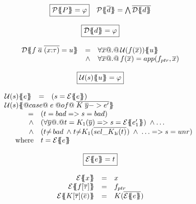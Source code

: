 \begin{figure}\small
\setlength{\arraycolsep}{2pt}
\[\begin{array}{c}
\ruleform{\ptrans{\Sigma}{P} = \formula{\phi} } \quad
\ptrans{\Sigma}{\ol{d}} = \bigwedge \ol{\dtrans{\Sigma}{d}}
\\ \\
\ruleform{\dtrans{\Sigma}{d} = \formula{\phi}} \\ \\
\begin{array}{rcl}
  \dtrans{\Sigma}{f \;\ol{a}\;\ol{(x{:}\tau)} = u}
    & =     & \formula{\forall \ol{x} @.@\, \utrans{\sigma}{u}{f(\ol{x})}} \\
    & \land & \formula{\forall \ol{x} @.@\, f(\ol{x}) = app(f_{ptr},\xs)} \\
\end{array}
\\ \\
\ruleform{\utrans{\Sigma}{u}{s} = \formula{\phi}} \\ \\
\begin{array}{rcl}
\utrans{\Sigma}{e}{s}
  & = & \formula{(s = \etrans{\Sigma}{\Gamma}{e})} \\
\multicolumn{3}{l}{\utrans{\Sigma}
    {@case@\;e\;@of@\;\ol{K\;\ol{y} -> e'}}{s}} \\
\multicolumn{3}{l}{
\quad
  \begin{array}[t]{rl}
    = & \formula{(t = \bad => s = bad)} \\
    \land & \formula{(\forall \ol{y} @.@ t = K_1(\ol{y}) => s = \etrans{\Sigma}{\Gamma}{e'_1})\;\land \ldots}  \\
    \land & \formula{(t{\neq}\bad\;\land\;
                 t{\neq}K_1(\oln{{\sel{K_1}{i}}(t)}{})\;\land\;\ldots => s=\unr)} \\
    \mbox{where} & t  =  \etrans{\Sigma}{\Gamma}{e}
 \end{array}
}
\end{array}
\\ \\
\ruleform{\etrans{\Sigma}{\Gamma}{e} = \formula{t} } \\ \\
\begin{array}{rcl}
\etrans{\Sigma}{\Gamma}{x} & = & \formula{x} \\
\etrans{\Sigma}{\Gamma}{f[\ol{\tau}]} & = & \formula{f_{ptr}} \\
\etrans{\Sigma}{\Gamma}{K[\ol{\tau}](\ol{e})} & = & \formula{K(\ol{\etrans{\Sigma}{\Gamma}{e}})} \\

\end{array}
\end{array}\]
\end{figure}
